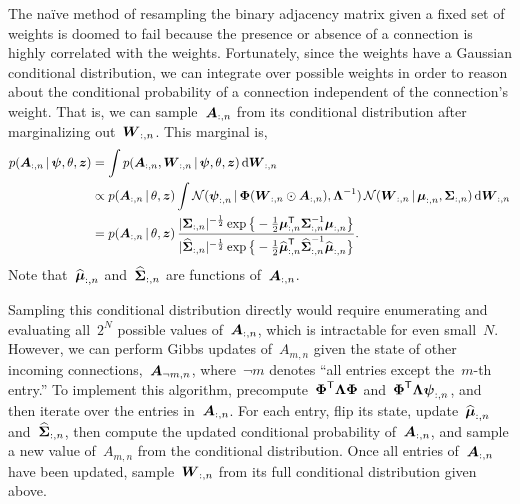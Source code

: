 The na\"ive method of resampling the binary adjacency matrix given a fixed set of weights is doomed to fail because the presence or absence of a connection is highly correlated with the weights. Fortunately, since the weights have a Gaussian conditional distribution, we can integrate over possible weights in order to reason about the conditional probability of a connection independent of the connection's weight. That is, we can sample~$\boldsymbol{A}_{:,n}$ from its conditional distribution after marginalizing out~$\boldsymbol{W}_{:,n}$. This marginal is,
\begin{align}
p(\boldsymbol{A}_{:,n} \,|\, \boldsymbol{\psi}, \theta, \boldsymbol{z}) 
&= \int p(\boldsymbol{A}_{:,n}, \boldsymbol{W}_{:,n} \,|\, \boldsymbol{\psi}, \theta, \boldsymbol{z}) \, \mathrm{d} \boldsymbol{W}_{:,n} \\
&\propto p(\boldsymbol{A}_{:,n} \,|\, \theta, \boldsymbol{z}) \int \mathcal{N}(\boldsymbol{\psi}_{:,n} \,|\, \boldsymbol{\Phi} (\boldsymbol{W}_{:,n} \odot \boldsymbol{A}_{:,n}), \boldsymbol{\Lambda}^{-1}) \, \mathcal{N}(\boldsymbol{W}_{:,n} \,|\, \boldsymbol{\mu}_{:,n}, \boldsymbol{\Sigma}_{:,n}) \, \mathrm{d} \boldsymbol{W}_{:,n} \\
&= p(\boldsymbol{A}_{:,n} \,|\, \theta, \boldsymbol{z})  \,
\frac{
|\boldsymbol{\Sigma}_{:,n}|^{-\frac{1}{2}}
\exp \big\{-\frac{1}{2} {\boldsymbol{\mu}}_{:,n}^{\mathsf{T}} {\boldsymbol{\Sigma}}_{:,n}^{-1} {\boldsymbol{\mu}}_{:,n} \big\}
}
{
|\widehat{\boldsymbol{\Sigma}}_{:,n}|^{-\frac{1}{2}}
\exp \big\{-\frac{1}{2} \widehat{\boldsymbol{\mu}}_{:,n}^{\mathsf{T}} \widehat{\boldsymbol{\Sigma}}_{:,n}^{-1} \widehat{\boldsymbol{\mu}}_{:,n} \big\} 
}.
\end{align}
Note that~$\widehat{\boldsymbol{\mu}}_{:,n}$ and~$\widehat{\boldsymbol{\Sigma}}_{:,n}$ are functions of~$\boldsymbol{A}_{:,n}$. 

Sampling this conditional distribution directly would require enumerating and evaluating all~$2^N$ possible values of~$\boldsymbol{A}_{:,n}$, which is intractable for even small~$N$. However, we can perform Gibbs updates of~$A_{m,n}$ given the state of other incoming connections,~$\boldsymbol{A}_{\neg m,n}$, where~$\neg m$ denotes ``all entries except the~$m$-th entry.'' To implement this algorithm, precompute~$\boldsymbol{\Phi}^{\mathsf{T}} \boldsymbol{\Lambda} \boldsymbol{\Phi}$ and~$\boldsymbol{\Phi}^{\mathsf{T}} \boldsymbol{\Lambda} \boldsymbol{\psi}_{:,n}$, and then iterate over the entries in~$\boldsymbol{A}_{:,n}$. For each entry, flip its state, update~$\widehat{\boldsymbol{\mu}}_{:,n}$ and~$\widehat{\boldsymbol{\Sigma}}_{:,n}$, then compute the updated conditional probability of~$\boldsymbol{A}_{:,n}$, and sample a new value of~$A_{m,n}$ from the conditional distribution. Once all entries of~$\boldsymbol{A}_{:,n}$ have been updated, sample~$\boldsymbol{W}_{:,n}$ from its full conditional distribution given above.

